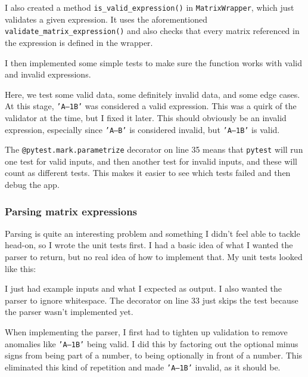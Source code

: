 \documentclass[../main.tex]{subfiles}
\begin{document}
I also created a method \texttt{is\_valid\_expression()} in \texttt{MatrixWrapper}, which just validates a given expression. It uses the aforementioned \texttt{validate\_matrix\_expression()} and also checks that every matrix referenced in the expression is defined in the wrapper.


I then implemented some simple tests to make sure the function works with valid and invalid expressions.


Here, we test some valid data, some definitely invalid data, and some edge cases. At this stage, \texttt{'A--1B'} was considered a valid expression. This was a quirk of the validator at the time, but I fixed it later. This should obviously be an invalid expression, especially since \texttt{'A--B'} is considered invalid, but \texttt{'A--1B'} is valid.

The \texttt{@pytest.mark.parametrize} decorator on line 35 means that \texttt{pytest} will run one test for valid inputs, and then another test for invalid inputs, and these will count as different tests. This makes it easier to see which tests failed and then debug the app.

\subsubsection{Parsing matrix expressions\label{development:matrices-backend:parsing-matrix-expressions}}

Parsing is quite an interesting problem and something I didn't feel able to tackle head-on, so I wrote the unit tests first. I had a basic idea of what I wanted the parser to return, but no real idea of how to implement that. My unit tests looked like this:


I just had example inputs and what I expected as output. I also wanted the parser to ignore whitespace. The decorator on line 33 just skips the test because the parser wasn't implemented yet.

When implementing the parser, I first had to tighten up validation to remove anomalies like \texttt{'A--1B'} being valid. I did this by factoring out the optional minus signs from being part of a number, to being optionally in front of a number. This eliminated this kind of repetition and made \texttt{'A--1B'} invalid, as it should be.
\end{document}
